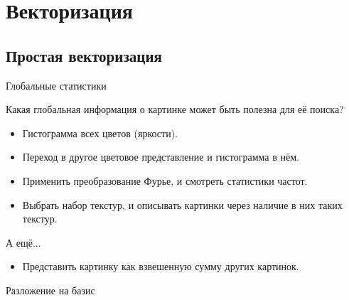 \section{Векторизация}

\subsection{Простая векторизация}

\begin{frame}{Глобальные статистики}

Какая глобальная информация о картинке может быть полезна для её поиска?

\begin{itemize}
    \item Гистограмма всех цветов (яркости).
    \item Переход в другое цветовое представление и гистограмма в нём.
    \item Применить преобразование Фурье, и смотреть статистики частот.
    \item Выбрать набор текстур, и описывать картинки через наличие в них таких текстур.
\end{itemize}

А ещё...

\pause
\begin{itemize}
    \item Представить картинку как взвешенную сумму других картинок.
\end{itemize}
    
\end{frame}

\begin{frame}{Разложение на базис}
    
\end{frame}






